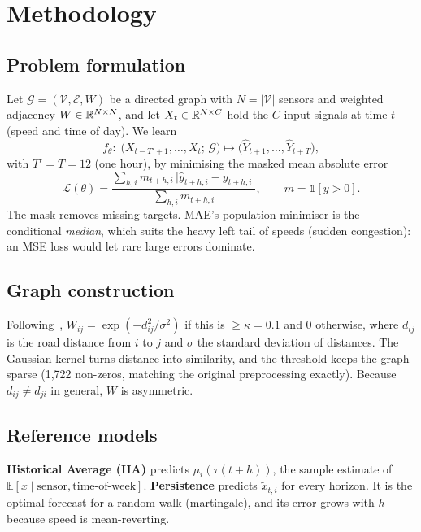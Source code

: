 \section{Methodology}
\label{sec:method}

\subsection{Problem formulation}
Let $\mathcal{G}=(\mathcal{V},\mathcal{E},W)$ be a directed graph with $N=|\mathcal{V}|$
sensors and weighted adjacency $W\in\mathbb{R}^{N\times N}$, and let $X_t\in\mathbb{R}^{N\times C}$
hold the $C$ input signals at time $t$ (speed and time of day). We learn
\begin{equation}
f_\theta:\; \big(X_{t-T'+1},\dots,X_t;\,\mathcal{G}\big)\mapsto \big(\hat{Y}_{t+1},\dots,\hat{Y}_{t+T}\big),
\end{equation}
with $T'=T=12$ (one hour), by minimising the masked mean absolute error
\begin{equation}
\mathcal{L}(\theta)=\frac{\sum_{h,i} m_{t+h,i}\,\big|\hat{y}_{t+h,i}-y_{t+h,i}\big|}{\sum_{h,i} m_{t+h,i}},\qquad m=\mathbb{1}[y>0].
\label{eq:loss}
\end{equation}
The mask removes missing targets. MAE's population minimiser is the conditional
\emph{median}, which suits the heavy left tail of speeds (sudden congestion):
an MSE loss would let rare large errors dominate.

\subsection{Graph construction}
Following~\cite{li2018dcrnn}, $W_{ij}=\exp(-d_{ij}^2/\sigma^2)$ if this is
$\ge\kappa=0.1$ and $0$ otherwise, where $d_{ij}$ is the road distance from $i$ to $j$ and
$\sigma$ the standard deviation of distances. The Gaussian kernel turns distance into
similarity, and the threshold keeps the graph sparse (1,722 non-zeros, matching the
original preprocessing exactly). Because $d_{ij}\neq d_{ji}$ in general, $W$ is
asymmetric.

\subsection{Reference models}
\textbf{Historical Average (HA)} predicts $\mu_i(\tau(t+h))$, the sample estimate of
$\mathbb{E}[x\mid\text{sensor},\text{time-of-week}]$. \textbf{Persistence} predicts
$\tilde{x}_{t,i}$ for every horizon. It is the optimal forecast for a random walk
(martingale), and its error grows with $h$ because speed is mean-reverting.

